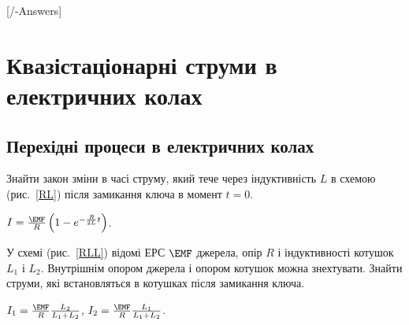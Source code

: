 
[\currfilebase/\currfilebase-Answers]
\chapter{Квазістаціонарні струми в електричних колах}\label{\currfilebase}
\def\eff{e\kern-2.2pt f\kern-3pt f}
\section{Перехідні процеси в електричних колах}

\begin{problem}\label{prb:RL}%
Знайти закон зміни в часі струму, який тече через індуктивність $L$ в схемою (рис.~\ref{RL}) після замикання ключа  в момент $t = 0$.
\begin{solution}
	$I = \frac{\EMF}{R}\left( 1-e^{-\frac{R}{2L}t}\right) $.
\end{solution}
\end{problem}

\begin{problem}\label{prb:RLL}%
У схемі (рис.~\ref{RLL}) відомі ЕРС $\EMF$ джерела, опір $R$ і індуктивності котушок $L_1$ і $L_2$. Внутрішнім опором джерела і опором котушок можна знехтувати. Знайти струми, які встановляться в котушках після замикання ключа.
\begin{solution}
	$I_1 = \frac{\EMF}{R} \frac{L_2}{L_1 + L_2}$, $I_2 = \frac{\EMF}{R} \frac{L_1}{L_1 + L_2}$.
\end{solution}
\end{problem}

